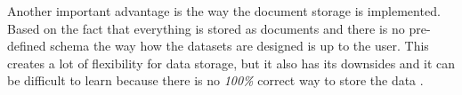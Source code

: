 %
Another important advantage is the way the document storage is implemented. Based on the fact that everything is stored as documents and there is no pre-defined schema the way how the datasets are designed is up to the user. This creates a lot of flexibility for data storage, but it also has its downsides and it can be difficult to learn because there is no \textit{100\%} correct way to store the data \cite{MoronyJosh}. 
%
%
